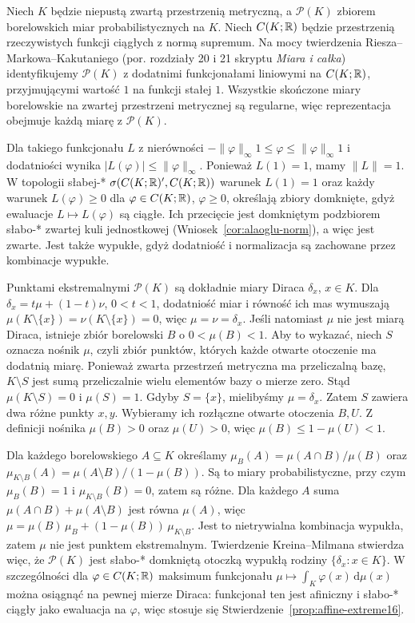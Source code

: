 \begin{przyklad}
\label{ex:prob-measures16}
Niech $K$ będzie niepustą zwartą przestrzenią metryczną,
a $\mathcal P(K)$ zbiorem borelowskich miar probabilistycznych na $K$.
Niech $C(K;\mathbb R)$ będzie przestrzenią rzeczywistych funkcji
ciągłych z normą supremum. Na mocy twierdzenia
Riesza--Markowa--Kakutaniego (por. rozdziały 20 i 21
skryptu \emph{Miara i całka}) identyfikujemy $\mathcal P(K)$
z dodatnimi funkcjonałami liniowymi na $C(K;\mathbb R)$,
przyjmującymi wartość $1$ na funkcji stałej $1$.
Wszystkie skończone miary borelowskie na zwartej przestrzeni
metrycznej są regularne, więc reprezentacja obejmuje każdą
miarę z $\mathcal P(K)$.

Dla takiego funkcjonału $L$ z nierówności
$-\|\varphi\|_\infty 1\le\varphi\le\|\varphi\|_\infty 1$
i dodatniości wynika $|L(\varphi)|\le\|\varphi\|_\infty$.
Ponieważ $L(1)=1$, mamy $\|L\|=1$.
W topologii słabej-* $\sigma(C(K;\mathbb R)',C(K;\mathbb R))$
warunek $L(1)=1$ oraz każdy warunek $L(\varphi)\ge0$
dla $\varphi\in C(K;\mathbb R)$, $\varphi\ge0$, określają zbiory
domknięte, gdyż ewaluacje $L\mapsto L(\varphi)$ są ciągłe.
Ich przecięcie jest domkniętym podzbiorem słabo-* zwartej
kuli jednostkowej (Wniosek~\ref{cor:alaoglu-norm}),
a więc jest zwarte. Jest także wypukłe, gdyż dodatniość
i normalizacja są zachowane przez kombinacje wypukłe.

Punktami ekstremalnymi $\mathcal P(K)$ są dokładnie
miary Diraca $\delta_x$, $x\in K$.
Dla $\delta_x=t\mu+(1-t)\nu$, $0<t<1$, dodatniość
miar i równość ich mas wymuszają
$\mu(K\setminus\{x\})=\nu(K\setminus\{x\})=0$,
więc $\mu=\nu=\delta_x$.
Jeśli natomiast $\mu$ nie jest miarą Diraca,
istnieje zbiór borelowski $B$ o $0<\mu(B)<1$.
Aby to wykazać, niech $S$ oznacza nośnik $\mu$, czyli zbiór
punktów, których każde otwarte otoczenie ma dodatnią miarę.
Ponieważ zwarta przestrzeń metryczna ma przeliczalną bazę,
$K\setminus S$ jest sumą przeliczalnie wielu elementów bazy
o mierze zero. Stąd $\mu(K\setminus S)=0$ i $\mu(S)=1$.
Gdyby $S=\{x\}$, mielibyśmy $\mu=\delta_x$.
Zatem $S$ zawiera dwa różne punkty $x,y$.
Wybieramy ich rozłączne otwarte otoczenia $B,U$.
Z definicji nośnika $\mu(B)>0$ oraz $\mu(U)>0$,
więc $\mu(B)\le1-\mu(U)<1$.

Dla każdego borelowskiego $A\subseteq K$ określamy
$\mu_B(A)=\mu(A\cap B)/\mu(B)$ oraz
$\mu_{K\setminus B}(A)=\mu(A\setminus B)/(1-\mu(B))$.
Są to miary probabilistyczne, przy czym
$\mu_B(B)=1$ i $\mu_{K\setminus B}(B)=0$, zatem są różne.
Dla każdego $A$ suma $\mu(A\cap B)+\mu(A\setminus B)$
jest równa $\mu(A)$, więc
$\mu=\mu(B)\,\mu_B+(1-\mu(B))\,\mu_{K\setminus B}$.
Jest to nietrywialna kombinacja wypukła, zatem $\mu$
nie jest punktem ekstremalnym.
Twierdzenie Kreina--Milmana stwierdza więc, że
$\mathcal P(K)$ jest słabo-* domkniętą otoczką wypukłą
rodziny $\{\delta_x:x\in K\}$.
W szczególności dla $\varphi\in C(K;\mathbb R)$
maksimum funkcjonału $\mu\mapsto\int_K\varphi(x)\,\mathrm d\mu(x)$
można osiągnąć na pewnej mierze Diraca: funkcjonał ten
jest afiniczny i słabo-* ciągły jako ewaluacja na $\varphi$,
więc stosuje się Stwierdzenie~\ref{prop:affine-extreme16}.
\end{przyklad}

